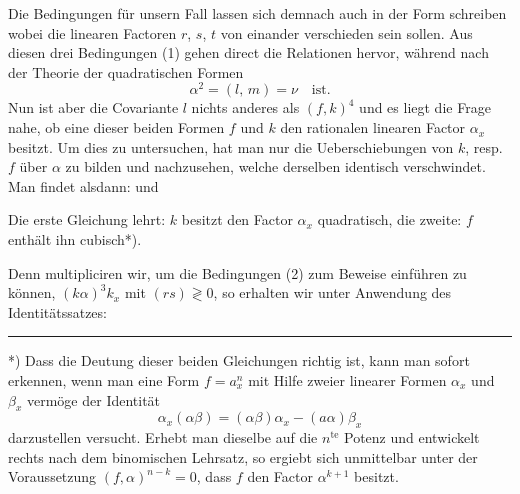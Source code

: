 Die Bedingungen für unsern Fall lassen sich demnach auch in der Form schreiben
wobei die linearen Factoren $r$, $s$, $t$ von einander verschieden sein sollen. Aus diesen drei Bedingungen (1) gehen direct die Relationen
hervor, während nach der Theorie der quadratischen Formen
\[
\alpha^2=(l,\,m)=\nu\quad\text{ist.}
\]
Nun ist aber die Covariante $l$ nichts anderes als $(f,k)^4$ und es liegt die Frage nahe, ob eine dieser beiden Formen $f$ und $k$ den rationalen linearen Factor $\alpha_x$ besitzt. Um dies zu untersuchen, hat man nur die Ueberschiebungen von $k$, resp. $f$ über $\alpha$ zu bilden und nachzusehen, welche derselben identisch verschwindet. Man findet alsdann:
und

Die erste Gleichung lehrt: $k$ besitzt den Factor $\alpha_x$ quadratisch, die zweite: $f$ enthält ihn cubisch*).

Denn multipliciren wir, um die Bedingungen (2) zum Beweise einführen zu können, $(k\alpha)^3k_x$ mit $(rs)\gtrless 0$, so erhalten wir unter Anwendung des Identitätssatzes:

\noindent\rule{4cm}{0.4pt}

*) Dass die Deutung dieser beiden Gleichungen richtig ist, kann man sofort erkennen, wenn man eine Form $f=a_x^n$ mit Hilfe zweier linearer Formen $\alpha_x$ und $\beta_x$ vermöge der Identität
\[
\alpha_x(\alpha\beta)=(\alpha\beta)\alpha_x-(a\alpha)\beta_x
\]
darzustellen versucht. Erhebt man dieselbe auf die $n^{\text{te}}$ Potenz und entwickelt rechts nach dem binomischen Lehrsatz, so ergiebt sich unmittelbar unter der Voraussetzung $(f,\alpha)^{n-k}=0$, dass $f$ den Factor $\alpha^{k+1}$ besitzt.



